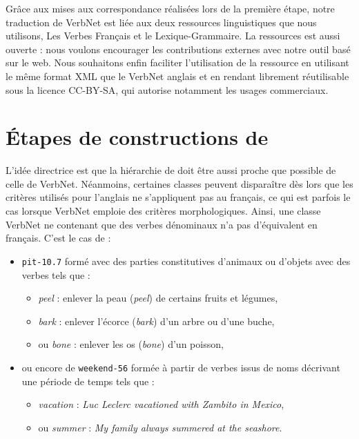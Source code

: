 Grâce aux mises aux correspondance réalisées lors de la première étape, notre
traduction de VerbNet est liée aux deux ressources linguistiques que nous
utilisons, Les Verbes Français et le Lexique-Grammaire. La ressources est aussi
ouverte : nous voulons encourager les contributions externes avec notre outil
basé sur le web. Nous souhaitons enfin faciliter l'utilisation de la ressource
en utilisant le même format XML que le VerbNet anglais et en rendant
\verbenet{} librement réutilisable sous la licence CC-BY-SA, qui autorise
notamment les usages commerciaux.

\section{Étapes de constructions de \verbenet{}}

L'idée directrice est que la hiérarchie de \verbenet{} doit être aussi proche
que possible de celle de VerbNet.  Néanmoins, certaines classes peuvent
disparaître dès lors que les critères utilisés pour l'anglais ne s'appliquent
pas au français, ce qui est parfois le cas lorsque VerbNet emploie des critères
morphologiques. Ainsi, une classe VerbNet ne contenant que des verbes
dénominaux n'a pas d'équivalent en français. C'est le cas de :

\begin{itemize}
    \item {\color{blue}\texttt{pit-10.7}} formé avec des parties constitutives
        d'animaux ou d'objets avec des verbes tels que :
        \begin{itemize}
            \item \textit{peel} : enlever la peau (\textit{peel}) de certains fruits
                et légumes,
            \item \textit{bark} : enlever l'écorce (\textit{bark}) d'un arbre ou
                d'une buche,
            \item ou \textit{bone} : enlever les os (\textit{bone}) d'un poisson,
        \end{itemize}
    \item ou encore de {\color{blue}\texttt{weekend-56}} formée à partir de
        verbes issus de noms décrivant une période de temps tels que :
        \begin{itemize}
            \item \textit{vacation} : \textit{Luc Leclerc vacationed with Zambito in
                Mexico},
            \item ou \textit{summer} : \textit{My family always summered at the seashore}.
        \end{itemize}
\end{itemize}

